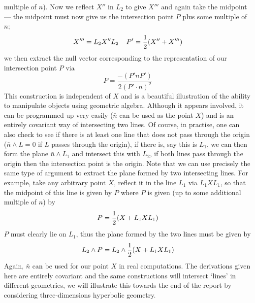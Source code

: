 multiple of $n$). Now we reflect $X''$ in $L_2$ to give $X'''$ and again
take the midpoint --- the midpoint must now give us the
intersection point $P$ plus some multiple of $n$;
%
\[ X''' = L_2X''L_2 \;\;\;\;  P' = \frac{1}{2} (X''+X''')   \]
%
we then extract the null vector corresponding to the representation of our
intersection point $P$ via
%
\[ P = \frac{-(P'nP')}{2(P'\cdot n)^2}   \]
%
This construction is independent of $X$ and is a
beautiful illustration of the ability to manipulate
objects using geometric algebra. Although it appears
involved, it can be programmed up very easily ($\bar{n}$
can be used as the point $X$) and is an entirely
covariant way of intersecting two lines. Of course, in
practise, one can also check to see if there is at least
one line that does not pass through the origin
($\bar{n}\wedge L=0$ if $L$ passes through the origin), if
there is, say this is $L_1$, we can then form the plane
$\bar{n}\wedge L_1$ and intersect this with $L_2$, if both
lines pass through the origin then the intersection point
is the origin. Note that we can use precisely the same
type of argument to extract the plane formed by two
intersecting lines. For example, take any arbitrary point
$X$, reflect it in the line $L_1$ via $L_1 X L_1$, so
that the midpoint of this line is given by $P$ where $P$
is given (up to some additional multiple of $n$) by
%
\[  P = \frac{1}{2} (X + L_1 X L_1)   \]
%
$P$ must clearly lie on $L_1$, thus the plane formed by
the two lines must be given by
%
\begin{equation}
 L_2\wedge P = L_2 \wedge \frac{1}{2}(X + L_1X L_1)
\end{equation}
%
Again, $\bar{n}$ can be used for our point $X$ in real
computations. The derivations given here are entirely
covariant and the same constructions will intersect
`lines' in different geometries, we will illustrate this
towards the end of the report by considering three-dimensions hyperbolic
geometry.

